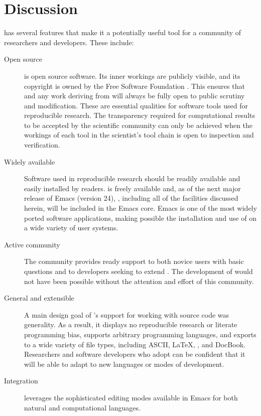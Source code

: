 \documentclass[article,shortnames]{jss}
\begin{document}
\section{Discussion}
\label{sec-5}
\label{discussion}


 has several features that make it a potentially useful tool
for a community of researchers and developers.  These include:

\begin{description}
\item[Open source]  is open source software.  Its inner
     workings are publicly visible, and its copyright is owned by the
     Free Software Foundation \citep{fsf}.  This ensures that
      and any work deriving from  will always be
     fully open to public scrutiny and modification.  These are
     essential qualities for software tools used for reproducible
     research.  The transparency required for computational results to
     be accepted by the scientific community can only be achieved when
     the workings of each tool in the scientist's tool chain is open to
     inspection and verification.
\item[Widely available] Software used in reproducible research should be
     readily available and easily installed by readers.   is
     freely available and, as of the next major release of Emacs
     (version 24), , including all of the facilities discussed
     herein, will be included in the Emacs core.  Emacs is one of the
     most widely ported software applications, making possible the
     installation and use of  on a wide variety of user
     systems.
\item[Active community] The  community provides ready
     support to both novice users with basic questions and to
     developers seeking to extend .  The development of
      would not have been possible without the attention and
     effort of this community.
\item[General and extensible] A main design goal of 's support
     for working with source code was generality.  As a result, it
     displays no reproducible research or literate programming bias,
     supports arbitrary programming languages, and exports to a wide
     variety of file types, including ASCII, \LaTeX{}, , and DocBook.
     Researchers and software developers who adopt  can be
     confident that it will be able to adapt to new languages or modes
     of development.
\item[Integration]  leverages the sophisticated editing modes
     available in Emacs for both natural and computational languages.
\end{description}
\end{document}
